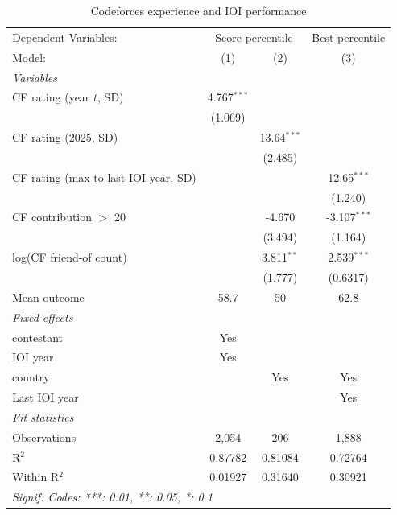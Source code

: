
\begin{table}[htbp]
   \caption{\label{tab:cf_regressions} Codeforces experience and IOI performance}
   \centering
   \begin{tabular}{lccc}
      \tabularnewline \midrule \midrule
      Dependent Variables: & \multicolumn{2}{c}{Score percentile} & Best percentile\\
      Model:                               & (1)           & (2)           & (3)\\  
      \midrule
      \emph{Variables}\\
      CF rating (year $t$, SD)             & 4.767$^{***}$ &               &   \\   
                                           & (1.069)       &               &   \\   
      CF rating (2025, SD)                 &               & 13.64$^{***}$ &   \\   
                                           &               & (2.485)       &   \\   
      CF rating (max to last IOI year, SD) &               &               & 12.65$^{***}$\\   
                                           &               &               & (1.240)\\   
      CF contribution $>$ 20               &               & -4.670        & -3.107$^{***}$\\   
                                           &               & (3.494)       & (1.164)\\   
      log(CF friend-of count)              &               & 3.811$^{**}$  & 2.539$^{***}$\\   
                                           &               & (1.777)       & (0.6317)\\   
      Mean outcome                         & 58.7          & 50            & 62.8\\  
      \midrule
      \emph{Fixed-effects}\\
      contestant                           & Yes           &               & \\  
      IOI year                             & Yes           &               & \\  
      country                              &               & Yes           & Yes\\  
      Last IOI year                        &               &               & Yes\\  
      \midrule
      \emph{Fit statistics}\\
      Observations                         & 2,054         & 206           & 1,888\\  
      R$^2$                                & 0.87782       & 0.81084       & 0.72764\\  
      Within R$^2$                         & 0.01927       & 0.31640       & 0.30921\\  
      \midrule \midrule
      \multicolumn{4}{l}{\emph{Signif. Codes: ***: 0.01, **: 0.05, *: 0.1}}\\
   \end{tabular}
   

\end{table}
